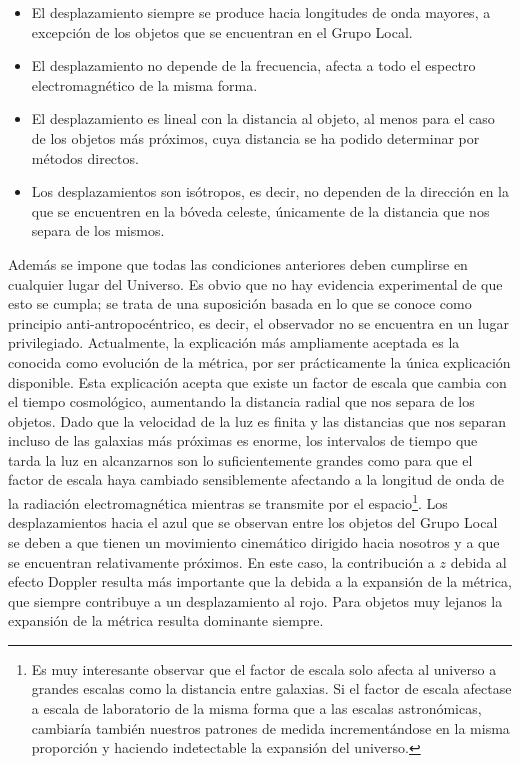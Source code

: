 \vspace{-2mm}
\begin{itemize}
    \item El desplazamiento siempre se produce hacia longitudes de onda mayores, a excepción de los objetos que se encuentran en el Grupo Local.
    \vspace{-2mm}
    
    \item El desplazamiento no depende de la frecuencia, afecta a todo el espectro electromagnético de la misma forma.
    \vspace{-2mm}
    
    \item El desplazamiento es lineal con la distancia al objeto, al menos para el caso de los objetos más próximos, cuya distancia se ha podido determinar por métodos directos.
    \vspace{-2mm}
    
    \item Los desplazamientos son isótropos, es decir, no dependen de la dirección en la que se encuentren en la bóveda celeste, únicamente de la distancia que nos separa de los mismos.
    
\end{itemize}

Además se impone que todas las condiciones anteriores deben cumplirse en cualquier lugar del Universo. Es obvio que no hay evidencia experimental de que esto se cumpla; se trata de una suposición basada en lo que se conoce como principio anti-antropocéntrico, es decir, el observador no se encuentra en un lugar privilegiado. 
Actualmente, la explicación más ampliamente aceptada es la conocida como evolución de la métrica, por ser prácticamente la única explicación disponible. Esta explicación acepta que existe un factor de escala que cambia con el tiempo cosmológico, aumentando la distancia radial que nos separa de los objetos. Dado que la velocidad de la luz es finita y las distancias que nos separan incluso de las galaxias más próximas es enorme, los intervalos de tiempo que tarda la luz en alcanzarnos son lo suficientemente grandes como para que el factor de escala haya cambiado sensiblemente afectando a la longitud de onda de la radiación electromagnética mientras se transmite por el espacio\footnote{Es muy interesante observar que el factor de escala solo afecta al universo a grandes escalas como la distancia entre galaxias. Si el factor de escala afectase a escala de laboratorio de la misma forma que a las escalas astronómicas, cambiaría también nuestros patrones de medida incrementándose en la misma proporción y haciendo indetectable la expansión del universo.}. Los desplazamientos hacia el azul que se observan entre los objetos del Grupo Local se deben a que tienen un movimiento cinemático dirigido hacia nosotros y a que se encuentran relativamente próximos. En este caso, la contribución a $z$ debida al efecto Doppler resulta más importante que la debida a la expansión de la métrica, que siempre contribuye a un desplazamiento al rojo. Para objetos muy lejanos la expansión de la métrica resulta dominante siempre.


